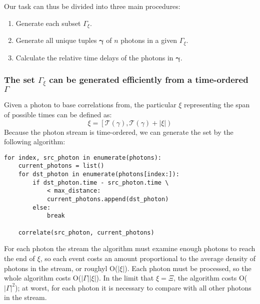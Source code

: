 \documentclass{article}
\newcommand{\braces}[1]{\ensuremath{\left\lbrace #1 \right\rbrace}}
\renewcommand{\vec}{\boldsymbol}
\newcommand{\abs}[1]{\ensuremath{\left|#1\right|}}
\newcommand{\Time}{\ensuremath{\mathcal{T}}}
\newcommand{\photon}{\ensuremath{\gamma}}
\newcommand{\photons}{\ensuremath{\Gamma}}
\newcommand{\integrationtime}{\ensuremath{\Xi}}
\newcommand{\timewindow}{\ensuremath{\xi}}
\begin{document}
Our task can thus be divided into three main procedures:
\begin{enumerate}
\item Generate each subset $\photons_{\timewindow}$.
\item Generate all unique tuples $\vec{\photon}$ of $n$ photons in a given $\photons_{\timewindow}$.
\item Calculate the relative time delays of the photons in $\vec{\photon}$.
\end{enumerate}

\subsubsection{The set $\photons_{\timewindow}$ can be generated efficiently from a time-ordered \photons}
Given a photon to base correlations from, the particular $\timewindow$ representing the span of possible times can be defined as:
\begin{equation}
\timewindow = \left[ \Time(\photon), \Time(\photon) + \abs{\timewindow} \right)
\end{equation}
Because the photon stream is time-ordered, we can generate the set by the following algorithm:
\begin{lstlisting}
for index, src_photon in enumerate(photons):
    current_photons = list()
    for dst_photon in enumerate(photons[index:]):
        if dst_photon.time - src_photon.time \ 
            < max_distance:
            current_photons.append(dst_photon)
        else:
            break

    correlate(src_photon, current_photons)
\end{lstlisting}
For each photon the stream the algorithm must examine enough photons to reach the end of $\timewindow$, so each event costs an amount proportional to the average density of photons in the stream, or roughyl O($\abs{\timewindow}$). Each photon must be processed, so the whole algorithm costs O($\abs{\photons}\abs{\timewindow}$). In the limit that $\timewindow=\integrationtime$, the algorithm costs O($\abs{\photons}^2$); at worst, for each photon it is necessary to compare with all other photons in the stream.
\end{document}
